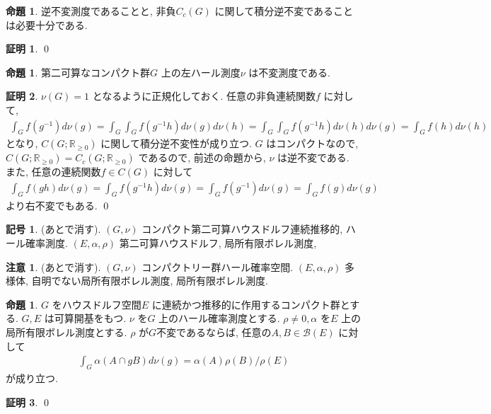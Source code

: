 \documentclass[10pt, fleqn, label-section=none]{bxjsarticle}
\theoremstyle{definition}
\newtheorem{prop}[dfn]{命題}
\newtheorem{notation}[dfn]{記号}
\newtheorem*{pf*}{証明}
\newtheorem{remark}[dfn]{注意}
\renewcommand{\;}{\, ; \,}
\begin{document}
\begin{prop}逆不変測度であることと, 非負$C_c(G)$ に関して積分逆不変であることは必要十分である.

\end{prop}
\begin{pf*}

\qed
\end{pf*}



\begin{prop}第二可算なコンパクト群$G$ 上の左ハール測度$\nu$ は不変測度である.
\end{prop}
\begin{pf*}$\nu(G) = 1$ となるように正規化しておく.  任意の非負連続関数$f$ に対して, 
\begin{align*} \int_G f(g^{-1}) d\nu(g) = \int_G \int_G f(g^{-1} h) d\nu(g) d\nu(h)
 = \int_G \int_G f(g^{-1} h) d\nu(h) d\nu(g) = \int_G f(h) d\nu(h)  \end{align*}
 となり, $C(G; \mathbb R_{\geq 0}) $ に関して積分逆不変性が成り立つ. $G$ はコンパクトなので, $C(G; \mathbb R_{\geq 0}) = C_c (G; \mathbb R_{\geq 0})$ であるので, 前述の命題から, $\nu$ は逆不変である. また, 任意の連続関数$f \in C(G)$ に対して
 \begin{align*}  \int_G f(gh) d\nu (g) = \int_G f(g^{-1}h) d\nu(g) = \int_G f(g^{-1}) d\nu(g) =  \int_G f(g) d\nu(g) \end{align*}
 より右不変でもある.
\qed
\end{pf*}


\begin{notation}(あとで消す). $(G, \nu)$ コンパクト第二可算ハウスドルフ連続推移的, ハール確率測度. 
$(E, \alpha, \rho)$ 第二可算ハウスドルフ, 局所有限ボレル測度, 

\end{notation}

\begin{remark}(あとで消す). $(G, \nu)$ コンパクトリー群ハール確率空間. $(E, \alpha, \rho)$ 多様体, 自明でない局所有限ボレル測度, 局所有限ボレル測度. 

\end{remark}


\begin{prop}$G$ をハウスドルフ空間$E$ に連続かつ推移的に作用するコンパクト群とする. $G, E$ は可算開基をもつ. $\nu$ を$G$ 上のハール確率測度とする. $\rho \neq 0, \alpha $ を$E$ 上の局所有限ボレル測度とする. $\rho$ が$G$不変であるならば, 任意の$A, B \in \mathcal B (E) $ に対して
\begin{align*} \int_G \alpha(A \cap gB) d\nu(g) = \alpha (A) \rho(B) / \rho (E)  \end{align*} 
が成り立つ. 
\end{prop}
\begin{pf*}




\qed
\end{pf*}
\end{document}

